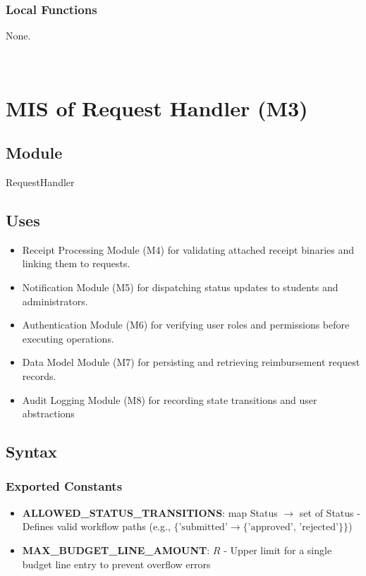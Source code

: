 \documentclass[12pt, titlepage]{article}
\begin{document}
\subsubsection{Local Functions}

None.


~\newpage

\section{MIS of Request Handler (M3)} \label{Request HandlerModule}

\subsection{Module}

RequestHandler

\subsection{Uses}

\begin{itemize}
  \item Receipt Processing Module (M4) for validating attached receipt binaries and linking them to requests.
  \item Notification Module (M5) for dispatching status updates to students and administrators.
  \item Authentication Module (M6) for verifying user roles and permissions before executing operations.
  \item Data Model Module (M7) for persisting and retrieving reimbursement request records.
  \item Audit Logging Module (M8) for recording state transitions and user abstractions
\end{itemize}

\subsection{Syntax}

\subsubsection{Exported Constants}

\begin{itemize}
  \item \textbf{ALLOWED\_STATUS\_TRANSITIONS}: map Status $\rightarrow$ set of Status - Defines valid workflow paths (e.g., $\{\text{'submitted'} \rightarrow \{\text{'approved', 'rejected'}\}\}$)  
  \item \textbf{MAX\_BUDGET\_LINE\_AMOUNT}: $R$ - Upper limit for a single budget line entry to prevent overflow errors
\end{itemize}
\end{document}
